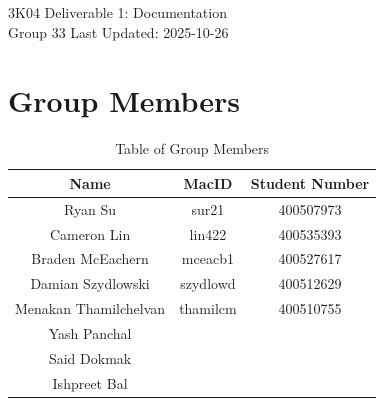 \documentclass{article}
\begin{document}

\begin{titlepage}
    \begin{center}
        \vspace*{1cm}
        \Huge
        3K04 Deliverable 1: Documentation
        \vspace{1cm}\\
        \huge
        Group 33
        \normalsize
        \vfill
        Last Updated: 2025-10-26
    \end{center}
 \end{titlepage}


\newpage
\tableofcontents


\newpage
{}
\listoffigures
{}

\listoftables
{}


\clearpage
{}
\newpage
\section{Group Members}
\begin{table}[H]
    \caption{Table of Group Members}
    \centering
    \begin{tabular}{|c|c|c|}
        \hline
        Name        & MacID         & Student Number    \\
        \hline
        Ryan Su     & sur21         & 400507973         \\
        \hline
        Cameron Lin & lin422        & 400535393         \\
        \hline
        Braden McEachern & mceacb1  & 400527617 \\
        \hline
        Damian Szydlowski & szydlowd & 400512629 \\
        \hline
        Menakan Thamilchelvan & thamilcm & 400510755\\ 
        \hline
        Yash Panchal & & \\
        \hline
        Said Dokmak & & \\
        \hline
        Ishpreet Bal & & \\
        \hline
    \end{tabular}
\end{table}
\end{document}
